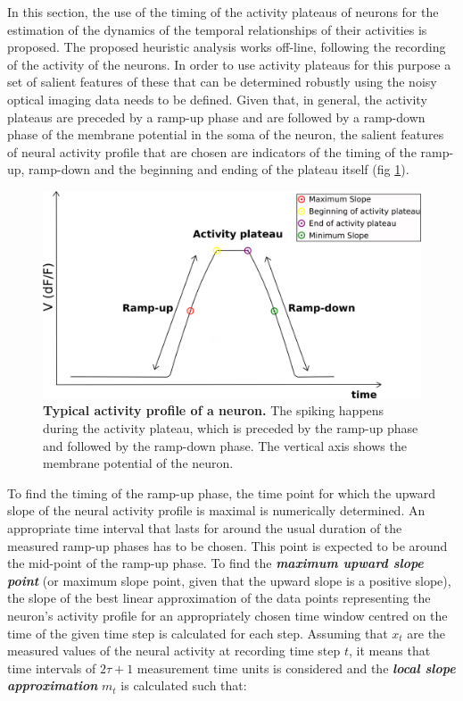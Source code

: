 In this section, the use of the timing of the activity plateaus of neurons for the estimation of the dynamics of the temporal relationships of their activities is proposed. The proposed heuristic analysis works off-line, following the recording of the activity of the neurons. In order to use activity plateaus for this purpose a set of salient features of these that can be determined robustly using the noisy optical imaging data needs to be defined. Given that, in general, the activity plateaus are preceded by a ramp-up phase and are followed by a ramp-down phase of the membrane potential in the soma of the neuron, the salient features of neural activity profile that are chosen are indicators of the timing of the ramp-up, ramp-down and the beginning and ending of the plateau itself (fig \ref{fig:activity_profile}).

\begin{figure}[H]
	\begin{center}
		\includegraphics[width=\columnwidth]{graphics/activity_profile.png}
		\caption[Typical activity profile of a neuron.]{\textbf{Typical activity profile of a neuron.} The spiking happens during the activity plateau, which is preceded by the ramp-up phase and followed by the ramp-down phase. The vertical axis shows the membrane potential of the neuron.}
		\label{fig:activity_profile}
	\end{center}
\end{figure}

To find the timing of the ramp-up phase, the time point for which the upward slope of the neural activity profile is maximal is numerically determined. An appropriate time interval that lasts for around the usual duration of the measured ramp-up phases has to be chosen. This point is expected to be around the mid-point of the ramp-up phase. To find the \textbf{\textit{maximum upward slope point}} (or maximum slope point, given that the upward slope is a positive slope), the slope of the best linear approximation of the data points representing the neuron's activity profile for an appropriately chosen time window centred on the time of the given time step is calculated for each step. Assuming that $x_{t}$ are the measured values of the neural activity at recording time step $t$, it means that time intervals of $2\tau+1$ measurement time units is considered and the \textbf{\textit{local slope approximation}} $m_{t}$ is calculated such that:

